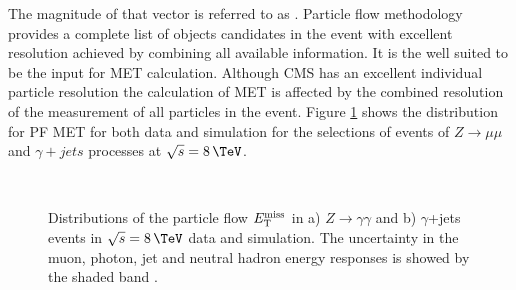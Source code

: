 The magnitude of that vector is referred to as . Particle flow methodology provides a complete list of objects candidates in the event with excellent resolution achieved by combining all available information. It is the well suited to be the input for \gls{MET} calculation. Although \gls{CMS} has an excellent individual particle resolution the calculation of \gls{MET} is affected by the combined resolution of the measurement of all particles in the event. Figure \ref{FIGURE:EventReconstructionPhysicsObjects_METDistributionZmumu} shows the distribution for \gls{PF} \gls{MET} for both data and simulation for the selections of events of $Z \rightarrow \mu\mu$ and $\gamma +jets$ processes at $\sqrt{s}=8\,\TeV$. 

\begin{figure}[!htp]%
\centering
{}\qquad
{}\\
 \caption[Distributions of the particle flow $\MET$ in $Z\rightarrow\gamma\gamma$ and $\gamma$+jets events in $\sqrt{s}=8\,\TeV$ data and simulation.]{Distributions of the particle flow $\MET$ in a) $Z\rightarrow\gamma\gamma$ and b) $\gamma$+jets events in $\sqrt{s}=8\,\TeV$ data and simulation. The uncertainty in the muon, photon, jet and neutral hadron energy responses is showed by the shaded band \cite{ARTICLE:CMSMETPerformance8TeV}.}
\label{FIGURE:EventReconstructionPhysicsObjects_METDistributionZmumu}
\end{figure}

